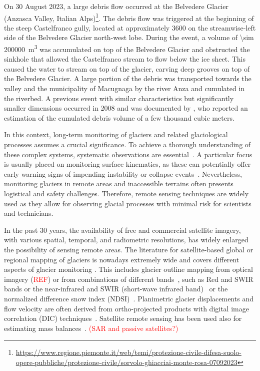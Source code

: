 On 30 August 2023, a large debris flow occurred at the Belvedere Glacier (Anzasca Valley, Italian Alps)\footnote{\url{https://www.regione.piemonte.it/web/temi/protezione-civile-difesa-suolo-opere-pubbliche/protezione-civile/sorvolo-ghiacciai-monte-rosa-07092023}}.
The debris flow was triggered at the beginning of the steep Castelfranco gully, located at approximately \SI{3600}{\masl} on the streamwise-left side of the Belvedere Glacier north-west lobe.
During the event, a volume of \SI{\sim 200000}{\cubic\meter} was accumulated on top of the Belvedere Glacier and obstructed the sinkhole that allowed the Castelfranco stream to flow below the ice sheet. 
This caused the water to stream on top of the glacier, carving deep grooves on top of the Belvedere Glacier. 
A large portion of the debris was transported towards the valley and the municipality of Macugnaga by the river Anza and cumulated in the riverbed.
A previous event with similar characteristics but significantly smaller dimensions occurred in 2008 and was documented by \cite{Mortara2009_ghiacciaoBelvedere}, who reported an estimation of the cumulated debris volume of a few thousand cubic meters.

In this context, long-term monitoring of glaciers and related glaciological processes assumes a crucial significance.
To achieve a thorough understanding of these complex systems, systematic observations are essential~\citep{Kaab2005}.
A particular focus is usually placed on monitoring surface kinematics, as these can potentially offer early warning signs of impending instability or collapse events~\citep{Faillettaz2015}.
Nevertheless, monitoring glaciers in remote areas and inaccessible terrains often presents logistical and safety challenges.
Therefore, remote sensing techniques are widely used as they allow for observing glacial processes with minimal risk for scientists and technicians. 

In the past 30 years, the availability of free and commercial satellite imagery, with various spatial, temporal, and radiometric resolutions, has widely enlarged the possibility of sensing remote areas.
The literature for satellite-based global or regional mapping of glaciers is nowadays extremely wide and covers different aspects of glacier monitoring \citep{Paul2007}. 
This includes glacier outline mapping from optical imagery (\textcolor{red}{REF}) or from combinations of different bands~\citep{Winsvold2016}, such as Red and SWIR bands or the near-infrared and SWIR (short-wave infrared band)~\citep{Paul_2002} or the normalized difference snow index (NDSI)~\citep{Hall1995}.
Planimetric glacier displacements and flow velocity are often derived from ortho-projected products with digital image correlation (DIC) techniques~\citep{Scambos1992, Kaab2005, Scherler2008, altena_kaab_2020}. 
Satellite remote sensing has been used also for estimating mass balances~\citep{Bamber2007, Berthier2016, Rabatel2017, Berthier2023}.
\textcolor{red}{(SAR and passive satellites?)}


